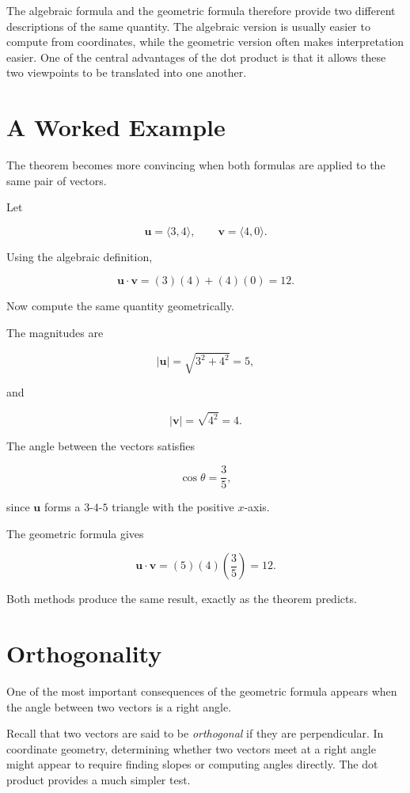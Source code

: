 The algebraic formula and the geometric formula therefore provide two
different descriptions of the same quantity. The algebraic version is
usually easier to compute from coordinates, while the geometric version
often makes interpretation easier. One of the central advantages of the
dot product is that it allows these two viewpoints to be translated into
one another.

\section{A Worked Example}

The theorem becomes more convincing when both formulas are applied to the
same pair of vectors.

\begin{example}
Let

\[
\mathbf{u}
=
\langle 3,4\rangle,
\qquad
\mathbf{v}
=
\langle 4,0\rangle.
\]

Using the algebraic definition,

\[
\mathbf{u}\cdot\mathbf{v}
=
(3)(4)+(4)(0)
=
12.
\]

Now compute the same quantity geometrically.

The magnitudes are

\[
|\mathbf{u}|
=
\sqrt{3^2+4^2}
=
5,
\]

and

\[
|\mathbf{v}|
=
\sqrt{4^2}
=
4.
\]

The angle between the vectors satisfies

\[
\cos\theta
=
\frac{3}{5},
\]

since $\mathbf{u}$ forms a $3$-$4$-$5$ triangle with the positive
$x$-axis.

The geometric formula gives

\[
\mathbf{u}\cdot\mathbf{v}
=
(5)(4)\left(\frac35\right)
=
12.
\]

Both methods produce the same result, exactly as the theorem predicts.
\end{example}

\section{Orthogonality}

One of the most important consequences of the geometric formula appears
when the angle between two vectors is a right angle.

Recall that two vectors are said to be \emph{orthogonal} if they are
perpendicular. In coordinate geometry, determining whether two vectors
meet at a right angle might appear to require finding slopes or computing
angles directly. The dot product provides a much simpler test.

